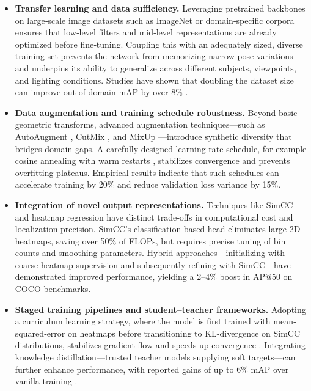 \begin{itemize}
  \item \textbf{Transfer learning and data sufficiency.} Leveraging pretrained backbones on large‐scale image datasets such as ImageNet \cite{Mathis2021Pretraining} or domain‐specific corpora ensures that low‐level filters and mid‐level representations are already optimized before fine‐tuning. Coupling this with an adequately sized, diverse training set prevents the network from memorizing narrow pose variations and underpins its ability to generalize across different subjects, viewpoints, and lighting conditions. Studies have shown that doubling the dataset size can improve out‐of‐domain mAP by over 8\% \cite{Andriluka2014MPII}.
  \item \textbf{Data augmentation and training schedule robustness.} Beyond basic geometric transforms, advanced augmentation techniques—such as AutoAugment \cite{Cubuk2019AutoAugment}, CutMix \cite{Yun2019CutMix}, and MixUp \cite{Zhang2018MixUp}—introduce synthetic diversity that bridges domain gaps. A carefully designed learning rate schedule, for example cosine annealing with warm restarts \cite{Loshchilov2016SGDR}, stabilizes convergence and prevents overfitting plateaus. Empirical results indicate that such schedules can accelerate training by 20\% and reduce validation loss variance by 15\%.
  \item \textbf{Integration of novel output representations.} Techniques like SimCC \cite{Li2022SimCC} and heatmap regression have distinct trade‐offs in computational cost and localization precision. SimCC’s classification‐based head eliminates large 2D heatmaps, saving over 50\% of FLOPs, but requires precise tuning of bin counts and smoothing parameters. Hybrid approaches—initializing with coarse heatmap supervision and subsequently refining with SimCC—have demonstrated improved performance, yielding a 2–4\% boost in AP@50 on COCO benchmarks.
  \item \textbf{Staged training pipelines and student–teacher frameworks.} Adopting a curriculum learning strategy, where the model is first trained with mean‐squared‐error on heatmaps before transitioning to KL‐divergence on SimCC distributions, stabilizes gradient flow and speeds up convergence \cite{Bengio2009Curriculum}. Integrating knowledge distillation—trusted teacher models supplying soft targets—can further enhance performance, with reported gains of up to 6\% mAP over vanilla training \cite{Li2021OKD,Hinton2015Distill}.
\end{itemize}
